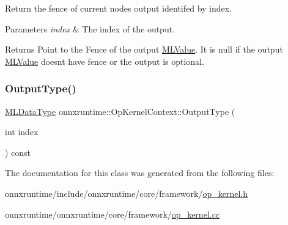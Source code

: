 Return the fence of current node\textquotesingle{}s output identifed by index. 
\begin{DoxyParams}{Parameters}
{\em index} & The index of the output. \\
\hline
\end{DoxyParams}
\begin{DoxyReturn}{Returns}
Point to the Fence of the output \mbox{\hyperlink{classonnxruntime_1_1MLValue}{M\+L\+Value}}. It is null if the output \mbox{\hyperlink{classonnxruntime_1_1MLValue}{M\+L\+Value}} doesn\textquotesingle{}t have fence or the output is optional. 
\end{DoxyReturn}
\mbox{\label{classonnxruntime_1_1OpKernelContext_a253e5bdfb161a27eec52823dcc6f63ce}} 
\subsubsection{\texorpdfstring{Output\+Type()}{OutputType()}}
{\footnotesize\ttfamily \mbox{\hyperlink{namespaceonnxruntime_ad77d0a6e838ec7da5dc35fed5ee66b49}{M\+L\+Data\+Type}} onnxruntime\+::\+Op\+Kernel\+Context\+::\+Output\+Type (\begin{DoxyParamCaption}\item[{int}]{index }\end{DoxyParamCaption}) const}



The documentation for this class was generated from the following files\+:\begin{DoxyCompactItemize}
\item 
onnxruntime/include/onnxruntime/core/framework/\mbox{\hyperlink{op__kernel_8h}{op\+\_\+kernel.\+h}}\item 
onnxruntime/onnxruntime/core/framework/\mbox{\hyperlink{op__kernel_8cc}{op\+\_\+kernel.\+cc}}\end{DoxyCompactItemize}
